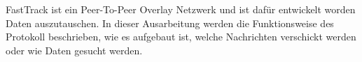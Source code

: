 FastTrack ist ein Peer-To-Peer Overlay Netzwerk und ist dafür entwickelt worden Daten auszutauschen. 
In dieser Ausarbeitung werden die Funktionsweise des Protokoll beschrieben, wie es aufgebaut ist, welche Nachrichten verschickt werden oder wie Daten gesucht werden.